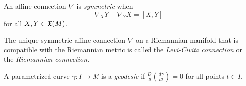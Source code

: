\documentclass[11pt, norsk]{article}
\begin{document}
\begin{defi}
 An affine connection $\nabla$ is \emph{symmetric} when
\[
\nabla_X Y - \nabla_Y X = [X,Y]
\]
for all $X,Y \in \mathfrak X(M)$.
\end{defi}


\begin{defi}
  
The unique symmetric  affine connection $\nabla$ on a Riemannian manifold that is compatible with the Riemannian metric is called the \emph{Levi-Civita connection} or the \emph{Riemannian connection}.
\end{defi}

\begin{defi}
  A parametrized curve $\gamma:I \to M$ is a \emph{geodesic} if $\frac{D}{dt}(\frac{d\gamma}{dt})=0$ for all points $t \in I$.
\end{defi}
\end{document}
